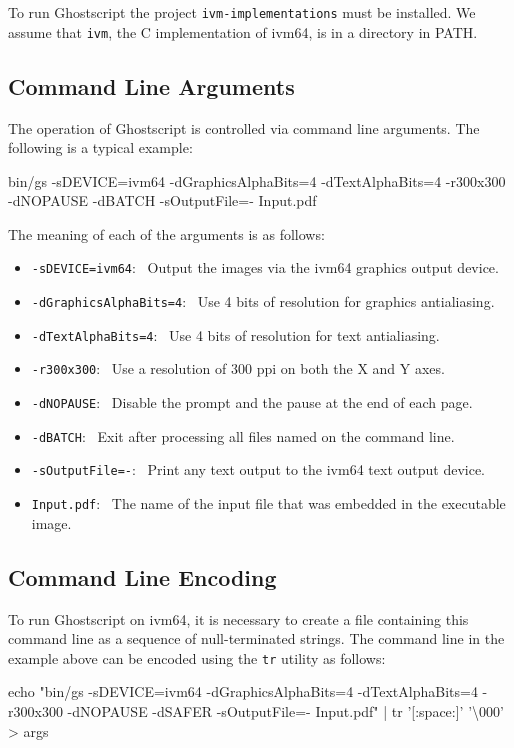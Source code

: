 \documentclass[a4paper,11pt]{article}
\newcommand{\code}[1]{\texttt{#1}}
\newenvironment{codeblock}{\begin{trivlist}\ttfamily
  \item }{\end{trivlist}}
\begin{document}
To run Ghostscript the project \code{ivm-implementations} must be installed.
We assume that \code{ivm}, the C implementation of ivm64, is in a directory in PATH.

\subsection{Command Line Arguments}

The operation of Ghostscript is controlled via command line arguments.
The following is a typical example:
\begin{codeblock}
bin/gs -sDEVICE=ivm64 -dGraphicsAlphaBits=4 -dTextAlphaBits=4 -r300x300 -dNOPAUSE -dBATCH -sOutputFile=- Input.pdf
\end{codeblock}
The meaning of each of the arguments is as follows:
\begin{itemize}
\item \code{-sDEVICE=ivm64}:~ Output the images via the ivm64 graphics output device.
\item \code{-dGraphicsAlphaBits=4}:~ Use 4 bits of resolution for graphics antialiasing.
\item \code{-dTextAlphaBits=4}:~ Use 4 bits of resolution for text antialiasing.
\item \code{-r300x300}:~ Use a resolution of 300 ppi on both the X and Y axes.
\item \code{-dNOPAUSE}:~ Disable the prompt and the pause at the end of each page.
\item \code{-dBATCH}:~ Exit after processing all files named on the command line.
\item \code{-sOutputFile=-}:~ Print any text output to the ivm64 text output device.
\item \code{Input.pdf}:~ The name of the input file that was embedded in the executable image.
\end{itemize}

\subsection{Command Line Encoding}

To run Ghostscript on ivm64, it is necessary to create a file containing this command line as a sequence of null-terminated strings.
The command line in the example above can be encoded using the \code{tr} utility as follows:
\begin{codeblock}
echo "bin/gs -sDEVICE=ivm64 -dGraphicsAlphaBits=4 -dTextAlphaBits=4 -r300x300 -dNOPAUSE -dSAFER -sOutputFile=- Input.pdf" | tr '[:space:]' '\textbackslash 000' > args
\end{codeblock}
\end{document}
